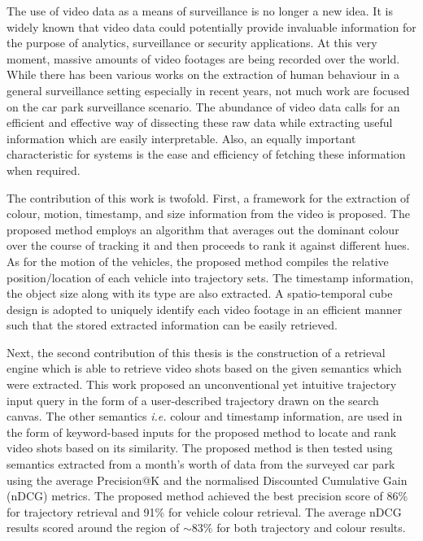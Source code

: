 
The use of video data as a means of surveillance is no longer a new idea. It is widely known that video data could potentially provide invaluable information for the purpose of analytics, surveillance or security applications. At this very moment, massive amounts of video footages are being recorded over the world. While there has been various works on the extraction of human behaviour in a general surveillance setting especially in recent years, not much work are focused on the car park surveillance scenario. The abundance of video data calls for an efficient and effective way of dissecting these raw data while extracting useful information which are easily interpretable. Also, an equally important characteristic for systems is the ease and efficiency of fetching these information when required.

The contribution of this work is twofold. First, a framework for the extraction of colour, motion, timestamp, and size information from the video is proposed.
The proposed method employs an algorithm that averages out the dominant colour over the course of tracking it and then proceeds to rank it against different hues.
As for the motion of the vehicles, the proposed method compiles the relative position/location of each vehicle into trajectory sets. The timestamp information, the object size along with its type are also extracted. A spatio-temporal cube design is adopted to uniquely identify each video footage in an efficient manner such that the stored extracted information can be easily retrieved. %

Next, the second contribution of this thesis is the construction of a retrieval engine which is able to retrieve video shots based on the given semantics which were extracted. This work proposed an unconventional yet intuitive trajectory input query in the form of a user-described trajectory drawn on the search canvas.
The other semantics \emph{i.e.} colour and timestamp information, are used in the form of keyword-based inputs for the proposed method to locate and rank video shots based on its similarity.
The proposed method is then tested using semantics extracted from a month's worth of data from the surveyed car park
using the average Precision@K and the normalised Discounted Cumulative Gain (nDCG) metrics. The proposed method achieved the best precision score of 86\% for trajectory retrieval and 91\% for vehicle colour retrieval. %
The average nDCG results scored around the region of $\sim$83\% for both trajectory and colour results.

